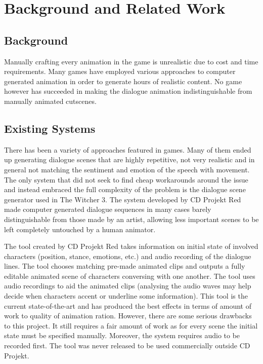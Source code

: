 \chapter{Background and Related Work \label{chap:background}}

\section{Background}
Manually crafting every animation in the game is unrealistic due to cost and time requirements. Many games have employed various approaches to computer generated animation in order to generate hours of realistic content. No game however has succeeded in making the dialogue animation indistinguishable from manually animated cutscenes.

\section{Existing Systems}

There has been a variety of approaches featured in games. Many of them ended up generating dialogue scenes that are highly repetitive, not very realistic and in general not matching the sentiment and emotion of the speech with movement. The only system that did not seek to find cheap workarounds around the issue and instead embraced the full complexity of the problem is the dialogue scene generator used in The Witcher 3. The system developed by CD Projekt Red made computer generated dialogue sequences in many cases barely distinguishable from those made by an artist, allowing less important scenes to be left completely untouched by a human animator. ~\cite{pcgamerwitcher}


The tool created by CD Projekt Red takes information on initial state of involved characters (position, stance, emotions, etc.) and audio recording of the dialogue lines. The tool chooses matching pre-made animated clips and outputs a fully editable animated scene of characters conversing with one another. The tool uses audio recordings to aid the animated clips (analysing the audio waves may help decide when characters accent or underline some information). This tool is the current state-of-the-art and has produced the best effects in terms of amount of work to quality of animation ration. However, there are some serious drawbacks to this project. It still requires a fair amount of work as for every scene the initial state must be specified manually. Moreover, the system requires audio to be recorded first. The tool was never released to be used commercially outside CD Projekt. ~\cite{gdcwitcher}


